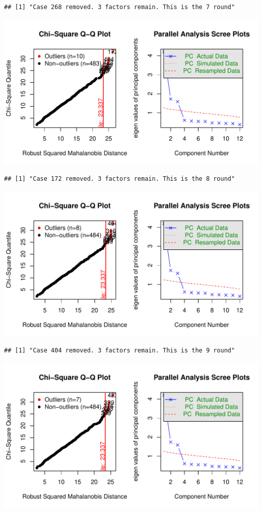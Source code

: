 \documentclass{article}\usepackage[]{graphicx}\usepackage[]{color}
\makeatletter
\def\maxwidth{ %
  \ifdim\Gin@nat@width>\linewidth
    \linewidth
  \else
    \Gin@nat@width
  \fi
}
\newenvironment{kframe}{%
 \def\at@end@of@kframe{}%
 \ifinner\ifhmode%
  \def\at@end@of@kframe{\end{minipage}}%
  \begin{minipage}{\columnwidth}%
 \fi\fi%
 \def\FrameCommand##1{\hskip\@totalleftmargin \hskip-\fboxsep
 \colorbox{shadecolor}{##1}\hskip-\fboxsep
     \hskip-\linewidth \hskip-\@totalleftmargin \hskip\columnwidth}%
 \MakeFramed {\advance\hsize-\width
   \@totalleftmargin\z@ \linewidth\hsize
   \@setminipage}}%
 {\par\unskip\endMakeFramed%
 \at@end@of@kframe}
\newenvironment{knitrout}{}{} %
\makeatother
\begin{document}
\begin{knitrout}
\begin{kframe}\begin{verbatim}
## [1] "Case 268 removed. 3 factors remain. This is the 7 round"
\end{verbatim}
\end{kframe}
\includegraphics[width=\maxwidth]{figure/unnamed-chunk-10-8} 
\begin{kframe}\begin{verbatim}
## [1] "Case 172 removed. 3 factors remain. This is the 8 round"
\end{verbatim}
\end{kframe}
\includegraphics[width=\maxwidth]{figure/unnamed-chunk-10-9} 
\begin{kframe}\begin{verbatim}
## [1] "Case 404 removed. 3 factors remain. This is the 9 round"
\end{verbatim}
\end{kframe}
\includegraphics[width=\maxwidth]{figure/unnamed-chunk-10-10} 

\end{knitrout}
\end{document}
